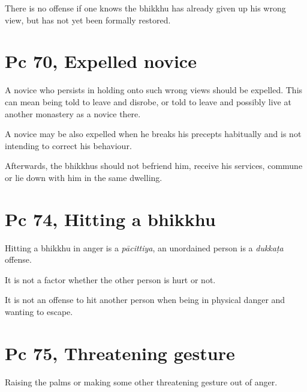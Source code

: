 There is no offense if one knows the bhikkhu has already given up his
wrong view, but has not yet been formally restored.

\section{Pc 70, Expelled novice}

A novice who persists in holding onto such wrong views should be
expelled. This can mean being told to leave and disrobe, or told to
leave and possibly live at another monastery as a novice there.

A novice may be also expelled when he breaks his precepts habitually and
is not intending to correct his behaviour.

Afterwards, the bhikkhus should not befriend him, receive his services,
commune or lie down with him in the same dwelling.

\section{Pc 74, Hitting a bhikkhu}

Hitting a bhikkhu in anger is a \emph{pācittiya}, an unordained person
is a \emph{dukkaṭa} offense.

It is not a factor whether the other person is hurt or not.

It is not an offense to hit another person when being in physical danger
and wanting to escape.

\section{Pc 75, Threatening gesture}

Raising the palms or making some other threatening gesture out of anger.


